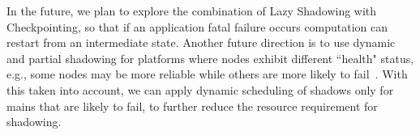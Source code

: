 In the future, we plan to explore the combination of Lazy Shadowing with Checkpointing, so that if an application fatal failure occurs computation can restart from an intermediate state. %
Another future direction is to use dynamic and partial shadowing for platforms where nodes exhibit different ``health" status, e.g., some nodes may be more reliable while others are more likely to fail~\cite{6468487}. 
With this taken into account, we can apply dynamic scheduling of shadows only for mains that are likely to fail, to further reduce the resource requirement for shadowing.

